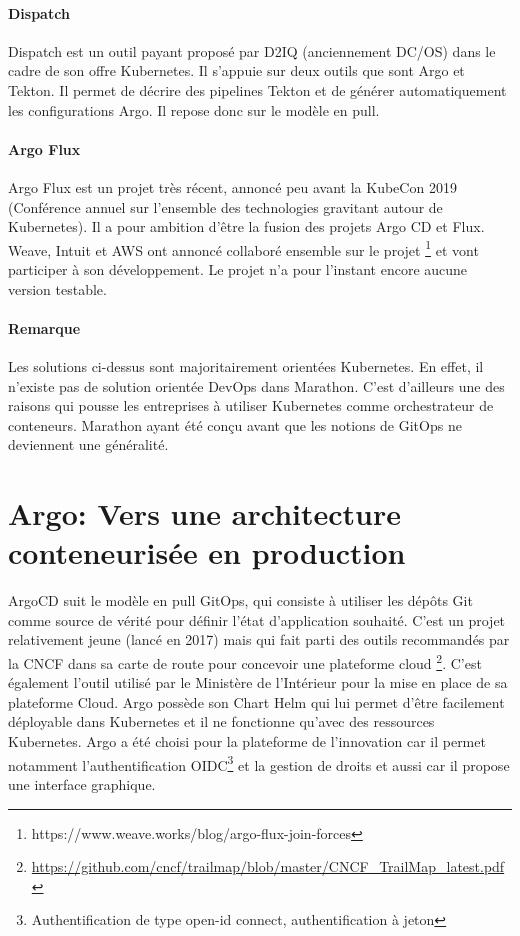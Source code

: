 \documentclass[11pt,fleqn]{book} %
\begin{document}
\paragraph{Dispatch}
Dispatch est un outil payant proposé par D2IQ (anciennement DC/OS) dans le cadre de son offre Kubernetes. Il s'appuie sur deux outils que sont Argo et Tekton. Il permet de décrire des pipelines Tekton et de générer automatiquement les configurations Argo. Il repose donc sur le modèle en pull.

\paragraph{Argo Flux}
Argo Flux est un projet très récent, annoncé peu avant la KubeCon 2019 (Conférence annuel sur l'ensemble des technologies gravitant autour de Kubernetes). Il a pour ambition d’être la fusion des projets Argo CD et Flux. Weave, Intuit et AWS ont annoncé collaboré ensemble sur le projet  \footnote{https://www.weave.works/blog/argo-flux-join-forces} et vont participer à son développement. Le projet n'a pour l'instant encore aucune version testable.

\begin{interrupt}
\paragraph{Remarque}
Les solutions ci-dessus sont majoritairement orientées Kubernetes. En effet, il n'existe pas de solution orientée DevOps dans Marathon. C'est d'ailleurs une des raisons qui pousse les entreprises à utiliser Kubernetes comme orchestrateur de conteneurs. Marathon ayant été conçu avant que les notions de GitOps ne deviennent une généralité.
\end{interrupt}
\section{Argo: Vers une architecture conteneurisée en production}

ArgoCD suit le modèle en pull GitOps, qui consiste à utiliser les dépôts Git comme source de vérité pour définir l'état d'application souhaité. C'est un projet relativement jeune (lancé en 2017) mais qui fait parti des outils recommandés par la CNCF dans sa carte de route pour concevoir une plateforme cloud \footnote{\url{https://github.com/cncf/trailmap/blob/master/CNCF_TrailMap_latest.pdf}}. C'est également l'outil utilisé par le Ministère de l'Intérieur pour la mise en place de sa plateforme Cloud.  Argo possède son Chart Helm qui lui permet d'être facilement déployable dans Kubernetes et il ne fonctionne qu'avec des ressources Kubernetes. Argo a été choisi pour la plateforme de l'innovation car il permet notamment l'authentification OIDC\footnote{Authentification de type open-id connect, authentification à jeton} et la gestion de droits et aussi car il propose une interface graphique. \newline
\end{document}
